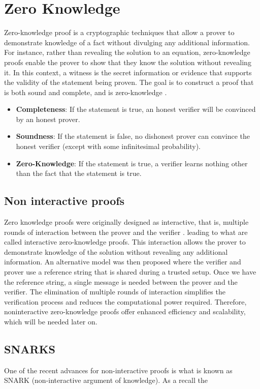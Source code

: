 \section{Zero Knowledge}
Zero-knowledge proof is a cryptographic techniques that allow a prover to demonstrate knowledge of a fact without divulging any additional information. 
For instance, rather than revealing the solution to an equation, zero-knowledge proofs enable the prover to show that they know the solution without revealing it. 
In this context, a witness is the secret information or evidence that supports the validity of the statement being proven. 
The goal is to construct a proof that is both sound and complete, and is zero-knowledge \cite{LZK}.

\begin{itemize}
\item \textbf{Completeness}: If the statement is true, an honest verifier will be convinced by an honest prover.
\item \textbf{Soundness}: If the statement is false, no dishonest prover can convince the honest verifier (except with some infinitesimal probability).
\item \textbf{Zero-Knowledge}: If the statement is true,  a verifier learns nothing other than the fact that the statement is true. \cite{LC23}
\end{itemize}


\subsection{Non interactive proofs}

Zero knowledge proofs were originally designed as interactive, that is, multiple rounds of interaction between the prover and the verifier \cite{GMR89}.
leading to what are called interactive zero-knowledge proofs. This interaction allows the prover to demonstrate knowledge of the solution without revealing any additional information.
An alternative model was then proposed where the verifier and prover use a reference string that is shared during a trusted setup. Once we have the reference string, a single message is needed between the prover and the verifier.
The elimination of multiple rounds of interaction simplifies the verification process and reduces the computational power required.
Therefore, noninteractive zero-knowledge proofs offer enhanced efficiency and scalability, which will be needed later on.  \cite{BFM88} \cite{GMW91}


\subsection{SNARKS}
One of the recent advances for non-interactive proofs is what is known as SNARK (non-interactive argument of knowledge).
As a recall the 

